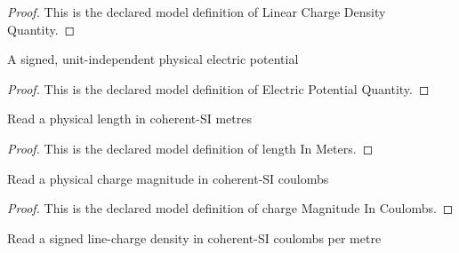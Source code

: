\begin{proof}
  This is the declared model definition of Linear Charge Density Quantity.
\end{proof}
\begin{definition}
  \label{def:physics:phyx-mini-0863:phyxminiproblems-problemphyxmini0863-electricpotentialquantity}
  A signed, unit-independent physical electric potential
\end{definition}
\begin{proof}
  This is the declared model definition of Electric Potential Quantity.
\end{proof}
\begin{definition}
  \label{def:physics:phyx-mini-0863:phyxminiproblems-problemphyxmini0863-lengthinmeters}
  Read a physical length in coherent-SI metres
\end{definition}
\begin{proof}
  This is the declared model definition of length In Meters.
\end{proof}
\begin{definition}
  \label{def:physics:phyx-mini-0863:phyxminiproblems-problemphyxmini0863-chargemagnitudeincoulombs}
  Read a physical charge magnitude in coherent-SI coulombs
\end{definition}
\begin{proof}
  This is the declared model definition of charge Magnitude In Coulombs.
\end{proof}
\begin{definition}
  \label{def:physics:phyx-mini-0863:phyxminiproblems-problemphyxmini0863-linearchargedensityincoulombspermeter}
  Read a signed line-charge density in coherent-SI coulombs per metre
\end{definition}

